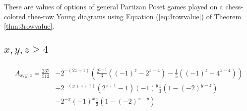 \label{sec:gameval}
These are values of options of general Partizan Poset games played on a chess-colored thee-row Young diagrams using Equation (\ref{eq:3rowvalue}) of Theorem \ref{thm:3rowvalue}.

\subsection*{$x,y,z\ge4$}
\begin{align*}
\begin{split}
A_{x,y,z}=\frac{237}{512} &-2^{-(2z+1)}\left(\frac{2^{z+1}}{3}\left((-1)^z-2^{z-4}\right)-\frac{1}{5}\left((-1)^z-4^{z-4}\right)\right)\\
& -2^{-(y+z+1)}\left(2^{z+1}-1\right)(-1)^y\frac{1}{3}\left(1-(-2)^{y-z}\right)\\
& -2^{-x}(-1)^x\frac{1}{3}\left(1-(-2)^{x-y}\right)
\end{split}
\end{align*}

\newpage
